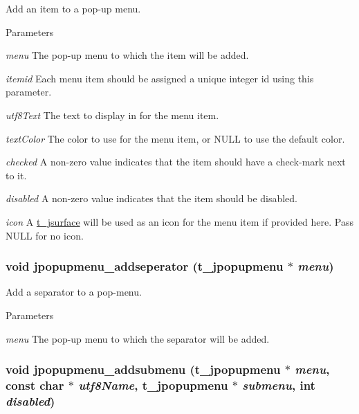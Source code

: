 Add an item to a pop-\/up menu. 
\begin{DoxyParams}{Parameters}
\item[{\em menu}]The pop-\/up menu to which the item will be added. \item[{\em itemid}]Each menu item should be assigned a unique integer id using this parameter. \item[{\em utf8Text}]The text to display in for the menu item. \item[{\em textColor}]The color to use for the menu item, or NULL to use the default color. \item[{\em checked}]A non-\/zero value indicates that the item should have a check-\/mark next to it. \item[{\em disabled}]A non-\/zero value indicates that the item should be disabled. \item[{\em icon}]A \hyperlink{group__jsurface_ga9ced037ee8d6676fcd561e1d3420c28b}{t\_\-jsurface} will be used as an icon for the menu item if provided here. Pass NULL for no icon. \end{DoxyParams}
\hypertarget{group__jpopupmenu_gad948b473c9ff12c1159960dcd36fb9a2}{
\subsubsection[{jpopupmenu\_\-addseperator}]{\setlength{\rightskip}{0pt plus 5cm}void jpopupmenu\_\-addseperator ({\bf t\_\-jpopupmenu} $\ast$ {\em menu})}}
\label{group__jpopupmenu_gad948b473c9ff12c1159960dcd36fb9a2}


Add a separator to a pop-\/menu. 
\begin{DoxyParams}{Parameters}
\item[{\em menu}]The pop-\/up menu to which the separator will be added. \end{DoxyParams}
\hypertarget{group__jpopupmenu_ga5ba90215f0693fe446f0f4c64af954b1}{
\subsubsection[{jpopupmenu\_\-addsubmenu}]{\setlength{\rightskip}{0pt plus 5cm}void jpopupmenu\_\-addsubmenu ({\bf t\_\-jpopupmenu} $\ast$ {\em menu}, \/  const char $\ast$ {\em utf8Name}, \/  {\bf t\_\-jpopupmenu} $\ast$ {\em submenu}, \/  int {\em disabled})}}
\label{group__jpopupmenu_ga5ba90215f0693fe446f0f4c64af954b1}


